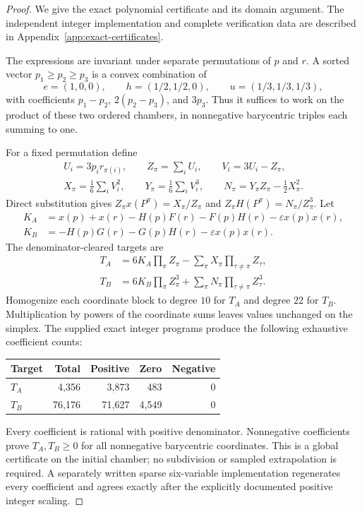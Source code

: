 \documentclass[11pt,reqno]{amsart}
\theoremstyle{definition}
\theoremstyle{remark}
\newcommand{\eps}{\varepsilon}
\begin{document}
\begin{proof}
We give the exact polynomial certificate and its domain argument. The independent integer implementation and complete verification data are described in Appendix~\ref{app:exact-certificates}.

The expressions are invariant under separate permutations of $p$ and $r$. A sorted vector $p_1\ge p_2\ge p_3$ is a convex combination of
\[
 e=(1,0,0),\qquad h=(1/2,1/2,0),\qquad u=(1/3,1/3,1/3),
\]
with coefficients $p_1-p_2$, $2(p_2-p_3)$, and $3p_3$. Thus it suffices to work on the product of these two ordered chambers, in nonnegative barycentric triples each summing to one.

For a fixed permutation define
\[
 \begin{gathered}
 U_i=3p_i r_{\pi(i)},\qquad Z_\pi=\sum_iU_i,\qquad V_i=3U_i-Z_\pi,\\
 X_\pi=\tfrac16\sum_iV_i^2,\qquad Y_\pi=\tfrac16\sum_iV_i^3,
 \qquad N_\pi=Y_\pi Z_\pi-\tfrac12X_\pi^2.
 \end{gathered}
\]
Direct substitution gives $Z_\pi x(P^\pi)=X_\pi/Z_\pi$ and
$Z_\pi H(P^\pi)=N_\pi/Z_\pi^3$. Let
\begin{align*}
 K_A&=x(p)+x(r)-H(p)F(r)-F(p)H(r)-\eps x(p)x(r),\\
 K_B&=-H(p)G(r)-G(p)H(r)-\eps x(p)x(r).
\end{align*}
The denominator-cleared targets are
\begin{align}
 T_A&=6K_A\prod_\pi Z_\pi-\sum_\pi X_\pi\prod_{\tau\ne\pi}Z_\tau,\label{eq:q3-cleared-A}\\
 T_B&=6K_B\prod_\pi Z_\pi^3+\sum_\pi N_\pi\prod_{\tau\ne\pi}Z_\tau^3.\label{eq:q3-cleared-B}
\end{align}
Homogenize each coordinate block to degree $10$ for $T_A$ and degree $22$ for $T_B$. Multiplication by powers of the coordinate sums leaves values unchanged on the simplex. The supplied exact integer programs produce the following exhaustive coefficient counts:
\begin{center}
\begin{tabular}{lrrrr}
\toprule
Target & Total & Positive & Zero & Negative\\
\midrule
$T_A$ & 4,356 & 3,873 & 483 & 0\\
$T_B$ & 76,176 & 71,627 & 4,549 & 0\\
\bottomrule
\end{tabular}
\end{center}
Every coefficient is rational with positive denominator. Nonnegative coefficients prove $T_A,T_B\ge0$ for all nonnegative barycentric coordinates. This is a global certificate on the initial chamber; no subdivision or sampled extrapolation is required. A separately written sparse six-variable implementation regenerates every coefficient and agrees exactly after the explicitly documented positive integer scaling.


\end{proof}
\end{document}
